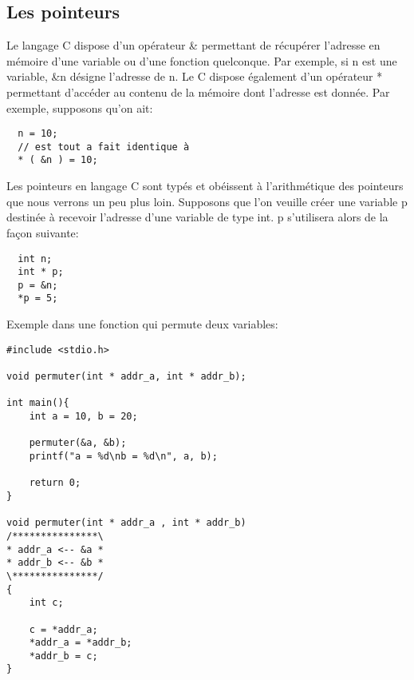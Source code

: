 \documentclass[a4paper]{article}
\begin{document}
\subsection{Les pointeurs}
Le langage C dispose d'un opérateur \guillemotleft{}\&\guillemotright{} permettant de récupérer l'adresse en mémoire d'une variable ou d'une fonction quelconque. Par exemple, si n est une variable, \&n désigne l'adresse de n. \newline
Le C dispose également d'un opérateur \guillemotleft{}*\guillemotright{} permettant d'accéder au contenu de la mémoire dont l'adresse est donnée. Par exemple, supposons qu'on ait: 
\begin{lstlisting}
  n = 10;
  // est tout a fait identique à
  * ( &n ) = 10;
\end{lstlisting}
Les pointeurs en langage C sont typés et obéissent à l'arithmétique des pointeurs que nous verrons un peu plus loin. Supposons que l'on veuille créer une variable \guillemotleft{} p \guillemotright{} destinée à recevoir l'adresse d'une variable de type int. \guillemotleft{} p \guillemotright{} s'utilisera alors de la façon suivante:
\begin{lstlisting}
  int n;
  int * p;
  p = &n;
  *p = 5;
\end{lstlisting}
Exemple dans une fonction qui permute deux variables:
\begin{lstlisting}
#include <stdio.h>

void permuter(int * addr_a, int * addr_b);

int main(){
    int a = 10, b = 20;
    
    permuter(&a, &b);
    printf("a = %d\nb = %d\n", a, b);
    
    return 0;
}

void permuter(int * addr_a , int * addr_b)
/***************\
* addr_a <-- &a *
* addr_b <-- &b *
\***************/
{
    int c;
    
    c = *addr_a;
    *addr_a = *addr_b;
    *addr_b = c;
}
\end{lstlisting}
\end{document}
